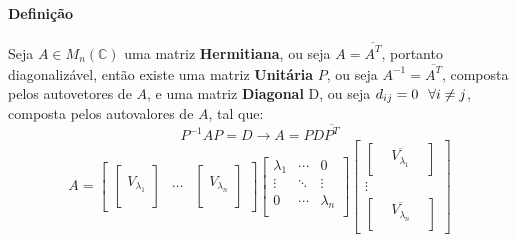 \documentclass{article}
\begin{document}
            \paragraph{Definição}Seja $A\in M_{n}(\mathbb{C})$ uma matriz \textbf{Hermitiana}, ou seja $A = \overline{A^{T}}$, portanto diagonalizável, então existe uma matriz \textbf{Unitária} $P$, ou seja $A^{-1} = \overline{A^{T}}$, composta pelos autovetores de $A$, e uma matriz \textbf{Diagonal} D, ou seja $d_{ij} = 0 \hspace{2.5mm} \forall i\neq j$, composta pelos autovalores de $A$, tal que:
                \[P^{-1} A P = D \rightarrow A = P D \overline{P^{T}}\]
                \[
                    \boxed{
                        A =
                        \begin{bmatrix}
                            \begin{bmatrix}
                                \\ V_{\lambda_{1}} \\ \\
                            \end{bmatrix} &
                            \cdots &
                            \begin{bmatrix}
                                \\ V_{\lambda_{n}} \\ \\
                            \end{bmatrix}
                        \end{bmatrix} 
                        \begin{bmatrix}
                            \lambda_{1} & \cdots & 0\\
                            \vdots      & \ddots & \vdots\\
                            0           & \cdots & \lambda_{n}\\
                        \end{bmatrix}
                        \begin{bmatrix}
                            \begin{bmatrix}
                                & \overline{V_{\lambda_{1}}} & \\
                            \end{bmatrix}\\
                            \vdots\\
                            \begin{bmatrix}
                                & \overline{V_{\lambda_{n}}} & \\
                            \end{bmatrix}
                        \end{bmatrix}
                    }
                \]
\end{document}
